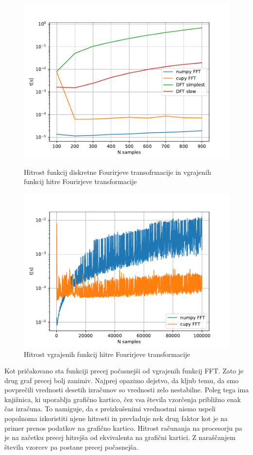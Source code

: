 \documentclass{article}
\begin{document}
\begin{figure}[H]
    \centering
    \begin{minipage}{0.48\textwidth}
        \centering
        \includegraphics[width=\textwidth]{dtf.pdf}
		\caption{Hitrost funkcij diskretne Fourirjeve transofrmacije in vgrajenih funkcij hitre Fourirjeve transformacije}
		\label{slika5}
    \end{minipage}
    \hfill
    \begin{minipage}{0.48\textwidth}
        \centering
        \includegraphics[width=\textwidth]{cupynumpy.pdf}
		\caption{Hitrost vgrajenih funkcij hitre Fourirjeve transformacije}
		\label{slika6}
    \end{minipage}
\end{figure}
Kot pričakovano sta funkciji precej počasnejši od vgrajenih funkcij FFT. Zato je drug graf precej bolj zanimiv. Najprej opazimo dejstvo, da kljub temu, da smo povprečili vrednosti desetih izračunov so vrednosti zelo nestabilne. Poleg tega ima knjižnica, ki uporablja grafično kartico, čez vsa števila vzorčenja približno enak čas izračuna. To namiguje, da s preizkušenimi vrednostmi nismo uspeli popolnoma izkoristiti njene hitrosti in prevladuje nek drug faktor kot je na primer prenos podatkov na grafično kartico. Hitrost računanja na procesorju pa je na začetku precej hitrejša od ekvivalenta na grafični kartici. Z naraščanjem števila vzorcev pa postane precej počasnejša. 
\end{document}
